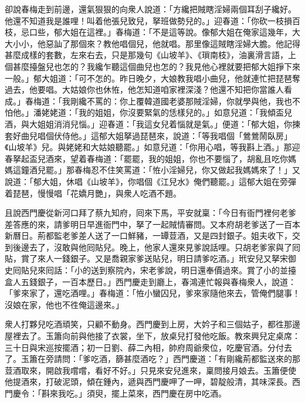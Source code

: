 卻說春梅走到前邊，還氣狠狠的向衆人說道：「方纔把賊瞎淫婦兩個耳刮子纔好。他還不知道我是誰哩！叫着他張兒致兒，拏班做勢兒的。」迎春道：「你砍一枝損百枝，{}忌口些，郁大姐在這裡。」春梅道：「不是這等說。像郁大姐在俺家這幾年，大大小小，他惡訕了那個來？教他唱個兒，他就唱。那里像這賊瞎淫婦大膽。他記得甚麼成樣的套數，左來右去，只是那幾句《山坡羊》、《瑣南枝》，油裏滑言語，上個甚麼擡盤兒也怎的？我纔乍聽這個曲兒也怎的？我見他心裡就要把郁大姐掙下來一般。」郁大姐道：「可不怎的。昨日晚夕，大娘教我唱小曲兒，他就連忙把琵琶奪過去，他要唱。大姑娘你也休恠，他怎知道咱家裡深淺？他還不知把你當誰人看成。」春梅道：「我剛纔不罵的：你上覆韓道國老婆那賊淫婦，你就學與他，我也不怕他。」潘姥姥道：「我的姐姐，你沒要緊氣的恁樣兒的。」{}如意兒道：「我傾盃兒酒，與大姐姐消消兒惱。」迎春道：「我這女兒着惱就是氣。」便道：「郁大姐，你揀套好曲兒唱個伏侍他。」這郁大姐拏過琵琶來，說道：「等我唱個「鶯鶯鬧臥房」《山坡羊》兒。與姥姥和大姑娘聽罷。」如意兒道：「你用心唱，等我斟上酒。」那迎春拏起盃兒酒來，望着春梅道：「罷罷，我的姐姐，你也不要惱了，胡亂且吃你媽媽這鐘酒兒罷。」那春梅忍不住笑罵道：「恠小淫婦兒，你又做起我媽媽來了！」{}又說道：「郁大姐，休唱《山坡羊》，你唱個《江兒水》俺們聽罷。」這郁大姐在旁彈着琵琶，慢慢唱「花嬌月艷」，與衆人吃酒不題。

且說西門慶從新河口拜了蔡九知府，囘來下馬，平安就稟：「今日有衙門裡何老爹差答應的來，請爹明日早進衙門中，拏了一起賊情審問。又本府胡老爹送了一百本新曆日。荊都監老爹差人送了一口鮮豬，一罈荳酒，又是四封銀子。姐夫收下，交到後邊去了，沒敢與他囘貼兒。晚上，他家人還來見爹說話哩。只胡老爹家與了囘貼，賞了來人一錢銀子。又是喬親家爹送貼兒，明日請爹吃酒。」玳安兒又拏宋御史囘貼兒來囘話：「小的送到察院內，宋老爹說，明日還奉價過來。賞了小的並擡盒人五錢銀子，一百本歷日。」西門慶走到廳上，春鴻連忙報與春梅衆人，說道：「爹來家了，還吃酒哩。」春梅道：「恠小蠻囚兒，爹來家隨他來去，管俺們腿事！沒娘在家，他也不徃俺這邊來。」

衆人打夥兒吃酒頑笑，只顧不動身。西門慶到上房，大妗子和三個姑子，都徃那邊屋裡去了。玉簫向前與他接了衣裳，坐下，放桌兒打發他吃飯。教來興兒定桌席：三十日與宋巡按擺酒；初一日劉、薛二內相，帥府周爺衆位，吃慶官酒。分付去了。玉簫在旁請問：「爹吃酒，篩甚麼酒吃？」西門慶道：「有剛纔荊都監送來的那荳酒取來，開啟我嚐嚐，看好不好。」只見來安兒進來，稟問接月娘去。玉簫便使他提酒來，打破泥頭，傾在鍾內，遞與西門慶呷了一呷，碧靛般清，其味深長。西門慶令：「斟來我吃。」須臾，擺上菜來，西門慶在房中吃酒。

